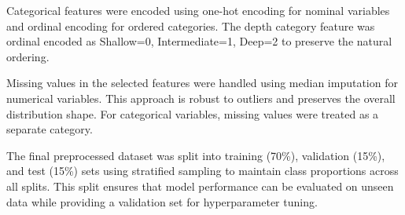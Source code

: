 Categorical features were encoded using one-hot encoding for nominal variables and ordinal encoding for ordered categories. The depth category feature was ordinal encoded as Shallow=0, Intermediate=1, Deep=2 to preserve the natural ordering.

Missing values in the selected features were handled using median imputation for numerical variables. This approach is robust to outliers and preserves the overall distribution shape. For categorical variables, missing values were treated as a separate category.

The final preprocessed dataset was split into training (70\%), validation (15\%), and test (15\%) sets using stratified sampling to maintain class proportions across all splits. This split ensures that model performance can be evaluated on unseen data while providing a validation set for hyperparameter tuning.
